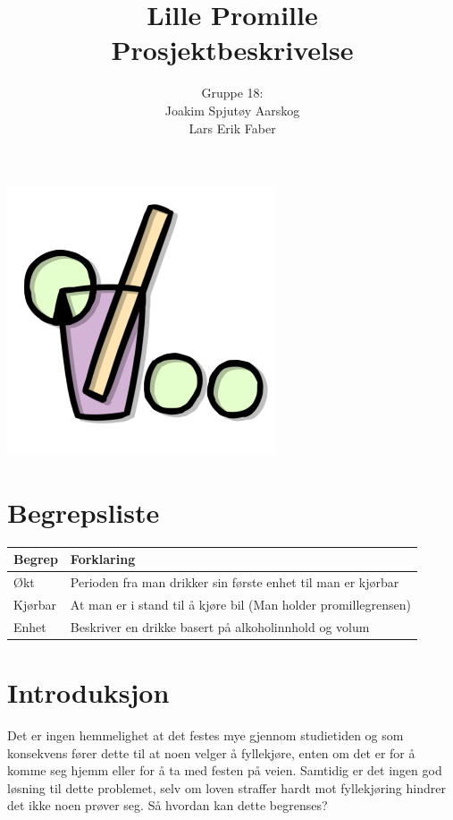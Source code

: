 \documentclass[12pt]{article}
\begin{document}
\title{%
    Lille Promille\\
    \large Prosjektbeskrivelse}
\author{
    Gruppe 18:\\
    Joakim Spjutøy Aarskog\\
    Lars Erik Faber}
\date{}
\maketitle
\begin{center}
    \includegraphics[scale=3]{images/lille_promille_logo.png}    
\end{center}
\thispagestyle{empty}
\newpage
\tableofcontents
\thispagestyle{empty}
\newpage
\setcounter{page}{1}

\section{Begrepsliste}
\begin{tabular}{ | m{4cm} | m{12cm} | } 
    \hline
    \textbf{Begrep} & \textbf{Forklaring} \\
    \hline
    Økt & Perioden fra man drikker sin første enhet til man er kjørbar \\
    \hline
    Kjørbar & At man er i stand til å kjøre bil (Man holder promillegrensen) \\
    \hline
    Enhet & Beskriver en drikke basert på alkoholinnhold og volum \\
    \hline
  \end{tabular}

\section{Introduksjon}
Det er ingen hemmelighet at det festes mye gjennom studietiden og som konsekvens fører dette til at noen velger å fyllekjøre, enten om det er for å komme seg hjemm eller for å ta med festen på veien. Samtidig er det ingen god løsning til dette problemet, selv om loven straffer hardt mot fyllekjøring hindrer det ikke noen prøver seg. Så hvordan kan dette begrenses?
\end{document}
